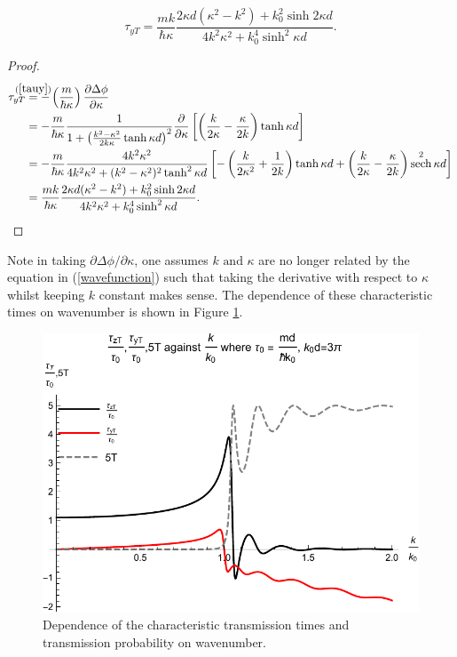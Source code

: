 \documentclass{article}
\DeclareMathOperator{\sech}{sech}
\begin{document}
\begin{equation}
	\tau_{yT} = \frac{mk}{\hbar\kappa}\frac{2\kappa d(\kappa^2-k^2)+k_0^2\sinh{2\kappa d}}{4k^2\kappa^2+k_0^4\sinh^2{\kappa d}}.
\end{equation}

\begin{proof}
\begin{subequations}
\begin{align}
	\tau_{yT} &\stackrel{\mathclap{(\ref{tauy})}}{=} -\left(\frac{m}{\hbar\kappa}\right)\frac{\partial\Delta\phi}{\partial\kappa} \\
	       &=-\frac{m}{\hbar\kappa}\frac{1}{1+\left(\frac{k^2-\kappa^2}{2k\kappa}\tanh{\kappa d}\right)^2} \frac{\partial}{\partial\kappa}\left[\left(\frac{k}{2\kappa}-\frac{\kappa}{2k}\right)\tanh{\kappa d}\right] \\
	       &=-\frac{m}{\hbar\kappa}\frac{4k^2\kappa^2}{4k^2\kappa^2+(k^2-\kappa^2)^2\tanh^2{\kappa d}}\left[-\left(\frac{k}{2\kappa^2}+\frac{1}{2k}\right)\tanh{\kappa d}+\left(\frac{k}{2\kappa}-\frac{\kappa}{2k}\right)\sech^2{\kappa d}\right] \\
	       &=\frac{mk}{\hbar\kappa}\frac{2\kappa d(\kappa^2-k^2)+k_0^2\sinh{2\kappa d}}{4k^2\kappa^2+k_0^4\sinh^2{\kappa d}}.
\end{align}
\end{subequations}
\end{proof}

\noindent Note in taking $\partial\Delta\phi/\partial\kappa$, one assumes $k \text{ and } \kappa $ are no longer related by the equation in (\ref{wavefunction}) such that taking the derivative with respect to $\kappa$ whilst keeping $k$ constant makes sense. The dependence of these characteristic times on wavenumber is shown in Figure \ref{fig:tzvst01}.

\begin{figure}[ht]
\centering
\includegraphics{plot3.pdf}
\caption{Dependence of the characteristic transmission times and transmission probability on wavenumber.}
\label{fig:tzvst01}
\end{figure}
\end{document}
